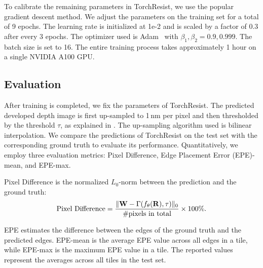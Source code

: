 To calibrate the remaining parameters in TorchResist, we use the popular gradient descent method. We adjust the parameters on the training set for a total of 9 epochs. The learning rate is initialized at 1e-2 and is scaled by a factor of 0.3 after every 3 epochs. The optimizer used is Adam~\cite{kingma2014adam} with $\beta_1, \beta_2 = 0.9, 0.999$. The batch size is set to 16. The entire training process takes approximately 1 hour on a single NVIDIA A100 GPU.

\subsection{Evaluation}

After training is completed, we fix the parameters of TorchResist. The predicted developed depth image is first up-sampled to 1$\,\text{nm}$ per pixel and then thresholded by the threshold $\tau$, as explained in . The up-sampling algorithm used is bilinear interpolation. We compare the predictions of TorchResist on the test set with the corresponding ground truth to evaluate its performance. Quantitatively, we employ three evaluation metrics: Pixel Difference, Edge Placement Error (EPE)-mean, and EPE-max. 

Pixel Difference is the normalized $L_0$-norm between the prediction and the ground truth:
\begin{equation}
     \text{Pixel Difference} = \frac{\| {\mathbf{W}} - \Gamma(f_\theta({\mathbf{R}}), \tau)\|_0}{\# \text{pixels in total}} \times 100\%.
\end{equation}

EPE estimates the difference between the edges of the ground truth and the predicted edges. EPE-mean is the average EPE value across all edges in a tile, while EPE-max is the maximum EPE value in a tile. The reported values represent the averages across all tiles in the test set.


\begin{table}[t!]
    \centering
    \caption{The performance comparison of the resist model on LithoBench. The lithography model is a commercial tool.}
    \label{tab:acc}
\end{table}

